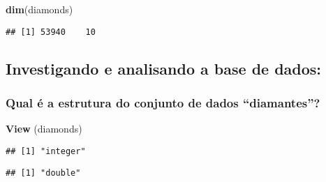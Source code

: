 \documentclass[
]{article}
\newenvironment{Shaded}{\begin{snugshade}}{\end{snugshade}}
\newcommand{\KeywordTok}[1]{\textcolor[rgb]{0.13,0.29,0.53}{\textbf{#1}}}
\newcommand{\NormalTok}[1]{#1}
\newcommand{\OperatorTok}[1]{\textcolor[rgb]{0.81,0.36,0.00}{\textbf{#1}}}
\begin{document}
\begin{Shaded}
\begin{Highlighting}[]
\KeywordTok{dim}\NormalTok{(diamonds)}
\end{Highlighting}
\end{Shaded}

\begin{verbatim}
## [1] 53940    10
\end{verbatim}

\hypertarget{investigando-e-analisando-a-base-de-dados}{%
\subsection{Investigando e analisando a base de
dados:}\label{investigando-e-analisando-a-base-de-dados}}

\hypertarget{qual-uxe9-a-estrutura-do-conjunto-de-dados-diamantes}{%
\subsubsection{Qual é a estrutura do conjunto de dados
``diamantes''?}\label{qual-uxe9-a-estrutura-do-conjunto-de-dados-diamantes}}

\begin{Shaded}
\begin{Highlighting}[]
\KeywordTok{View}\NormalTok{ (diamonds)}
\end{Highlighting}
\end{Shaded}

\begin{Shaded}
\end{Shaded}

\begin{verbatim}
## [1] "integer"
\end{verbatim}

\begin{Shaded}
\end{Shaded}

\begin{verbatim}
## [1] "double"
\end{verbatim}

\begin{Shaded}
\end{Shaded}
\end{document}
